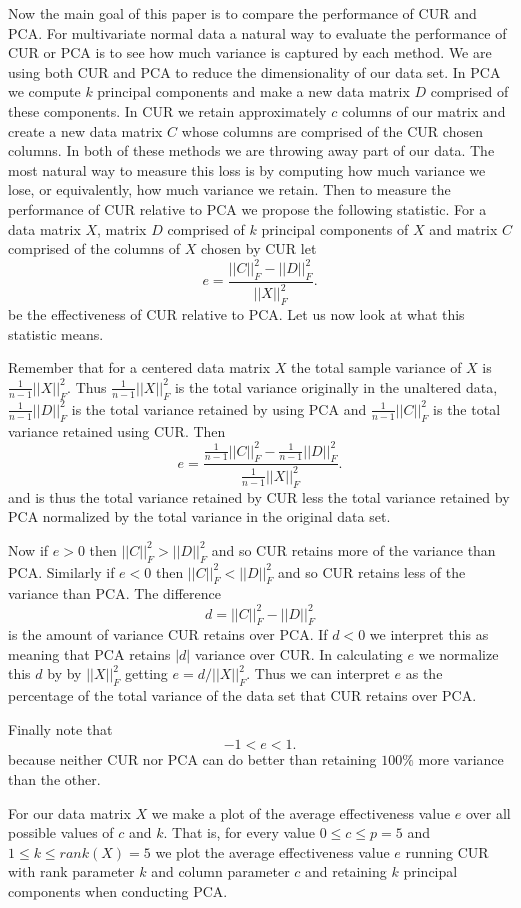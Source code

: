 \documentclass{book}
\begin{document}
Now the main goal of this paper is to compare the performance of CUR and PCA. For multivariate normal data a natural way to evaluate the performance of CUR or PCA is to see how much variance is captured by each method. We are using both CUR and PCA to reduce the dimensionality of our data set. In PCA we compute $k$ principal components and make a new data matrix $D$ comprised of these components. In CUR we retain approximately $c$ columns of our matrix and create a new data matrix $C$ whose columns are comprised of the CUR chosen columns. In both of these methods we are throwing away part of our data. The most natural way to measure this loss is by computing how much variance we lose, or equivalently, how much variance we retain. Then to measure the performance of CUR relative to PCA we propose the following statistic. For a data matrix $X$, matrix $D$ comprised of $k$ principal components of $X$ and matrix $C$ comprised of the columns of $X$ chosen by CUR let
$$
e=\frac{||C||^2_F-||D||_F^2}{||X||^2_F}.
$$
be the effectiveness of CUR relative to PCA. Let us now look at what this statistic means. 

Remember that for a centered data matrix $X$ the total sample variance of $X$ is $\frac{1}{n-1}||X||^2_F$. Thus $\frac{1}{n-1}||X||^2_F$ is the total variance originally in the unaltered data, $\frac{1}{n-1}||D||^2_F$ is the total variance retained by using PCA and $\frac{1}{n-1}||C||^2_F$ is the total variance retained using CUR. Then
$$
e=\frac{\frac{1}{n-1}||C||^2_F-\frac{1}{n-1}||D||_F^2}{\frac{1}{n-1}||X||^2_F}.
$$
and is thus the total variance retained by CUR less the total variance retained by PCA normalized by the total variance in the original data set. 

Now if $e > 0$ then $||C||_F^2>||D||_F^2$ and so CUR retains more of the variance than PCA. Similarly if $e<0$ then $||C||_F^2<||D||_F^2$ and so CUR retains less of the variance than PCA. The difference
$$
d=||C||_F^2-||D||_F^2
$$
is the amount of variance CUR retains over PCA. If $d<0$ we interpret this as meaning that PCA retains $|d|$ variance over CUR. In calculating $e$ we normalize this $d$ by by $||X||_F^2$ getting $e=d/||X||_F^2$. Thus we can interpret $e$ as the percentage of the total variance of the data set that CUR retains over PCA. 

Finally note that
$$
-1< e < 1.
$$
because neither CUR nor PCA can do better than retaining $100\%$ more variance than the other. 


For our data matrix $X$ we make a plot of the average effectiveness value $e$ over all possible values of $c$ and $k$. That is, for every value $0\leq c \leq p=5$ and $1 \leq k \leq rank(X)=5$ we plot the average effectiveness value $e$ running CUR with rank parameter $k$ and column parameter $c$ and retaining $k$ principal components when conducting PCA. 
\end{document}
